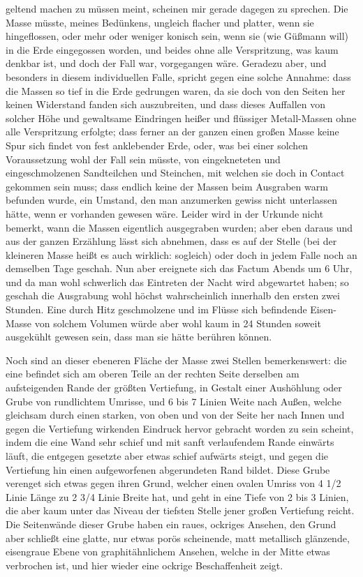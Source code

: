 \documentclass[a4paper, 11pt, oneside, german]{article}
\begin{document}
geltend machen zu müssen meint, scheinen mir gerade dagegen zu sprechen. Die Masse müsste, meines Bedünkens, ungleich flacher und platter, wenn sie hingeflossen, oder mehr oder weniger konisch sein, wenn sie (wie Güßmann will) in die Erde eingegossen worden, und beides ohne alle Verspritzung, was kaum denkbar ist, und doch der Fall war, vorgegangen wäre.  
Geradezu aber, und besonders in diesem individuellen Falle, spricht gegen eine solche Annahme: dass die Massen so tief in die Erde gedrungen waren, da sie doch von den Seiten her keinen Widerstand fanden sich auszubreiten, und dass dieses Auffallen von solcher Höhe und gewaltsame Eindringen heißer und flüssiger Metall-Massen ohne alle Verspritzung erfolgte; dass ferner an der ganzen einen großen Masse keine Spur sich findet von fest anklebender Erde, oder, was bei einer solchen Voraussetzung wohl der Fall sein müsste, von eingekneteten und eingeschmolzenen Sandteilchen und Steinchen, mit welchen sie doch in Contact gekommen sein muss; dass endlich keine der Massen beim Ausgraben warm befunden wurde, ein Umstand, den man anzumerken gewiss nicht unterlassen hätte, wenn er vorhanden gewesen wäre. Leider wird in der Urkunde nicht bemerkt, wann die Massen eigentlich ausgegraben wurden; aber eben daraus und aus der ganzen Erzählung lässt sich abnehmen, dass es auf der Stelle (bei der kleineren Masse heißt es auch wirklich: sogleich) oder doch in jedem Falle noch an demselben Tage geschah. Nun aber ereignete sich das Factum Abends um 6 Uhr, und da man wohl schwerlich das Eintreten der Nacht wird abgewartet haben; so geschah die Ausgrabung wohl höchst wahrscheinlich innerhalb den ersten zwei Stunden. Eine durch Hitz geschmolzene und im Flüsse sich befindende Eisen-Masse von solchem Volumen würde aber wohl kaum in 24 Stunden soweit ausgekühlt gewesen sein, dass man sie hätte berühren können.

Noch sind an dieser ebeneren Fläche der Masse zwei Stellen bemerkenswert: die eine befindet sich am oberen Teile an der rechten Seite derselben am aufsteigenden Rande der größten Vertiefung, in Gestalt einer Aushöhlung oder Grube von rundlichtem Umrisse, und 6 bis 7 Linien Weite nach Außen, welche gleichsam durch einen starken, von oben und von der Seite her nach Innen und gegen die Vertiefung wirkenden Eindruck hervor gebracht worden zu sein scheint, indem die eine Wand sehr schief und mit sanft verlaufendem Rande einwärts läuft, die entgegen gesetzte aber etwas schief aufwärts steigt, und gegen die Vertiefung hin einen aufgeworfenen abgerundeten Rand bildet. Diese Grube verenget sich etwas gegen ihren Grund, welcher einen ovalen Umriss von 4 1/2 Linie Länge zu 2 3/4 Linie Breite hat, und geht in eine Tiefe von 2 bis 3 Linien, die aber kaum unter das Niveau der tiefsten Stelle jener großen Vertiefung reicht. Die Seitenwände dieser Grube haben ein raues, ockriges Ansehen, den Grund aber schließt eine glatte, nur etwas porös scheinende, matt metallisch glänzende, eisengraue Ebene von graphitähnlichem Ansehen, welche in der Mitte etwas verbrochen ist, und hier wieder eine ockrige Beschaffenheit zeigt.
\end{document}
